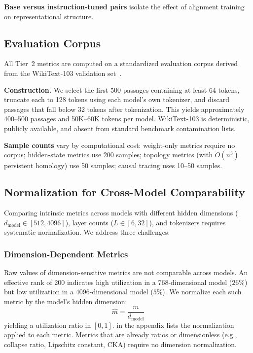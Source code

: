 \documentclass{article}
\begin{document}
\textbf{Base versus instruction-tuned pairs} isolate the effect of alignment training on representational structure.

\subsection{Evaluation Corpus}
\label{sec:corpus}

All Tier~2 metrics are computed on a standardized evaluation corpus derived from the WikiText-103 validation set~\citep{merity2017pointer}.

\textbf{Construction.}
We select the first 500 passages containing at least 64 tokens, truncate each to 128 tokens using each model's own tokenizer, and discard passages that fall below 32 tokens after tokenization.
This yields approximately 400--500 passages and 50K--60K tokens per model.
WikiText-103 is deterministic, publicly available, and absent from standard benchmark contamination lists.

\textbf{Sample counts} vary by computational cost: weight-only metrics require no corpus; hidden-state metrics use 200 samples; topology metrics (with $O(n^3)$ persistent homology) use 50 samples; causal tracing uses 10--50 samples.

\subsection{Normalization for Cross-Model Comparability}
\label{sec:normalization}

Comparing intrinsic metrics across models with different hidden dimensions ($d_{\text{model}} \in [512, 4096]$), layer counts ($L \in [6, 32]$), and tokenizers requires systematic normalization. We address three challenges.

\subsubsection{Dimension-Dependent Metrics}
\label{sec:norm-dim}

Raw values of dimension-sensitive metrics are not comparable across models. An effective rank of 200 indicates high utilization in a 768-dimensional model ($26\%$) but low utilization in a 4096-dimensional model ($5\%$).
We normalize each such metric by the model's hidden dimension:
\begin{equation}
  \hat{m} = \frac{m}{d_{\text{model}}}
  \label{eq:dim-norm}
\end{equation}
yielding a utilization ratio in $[0, 1]$.
 in the appendix lists the normalization applied to each metric.
Metrics that are already ratios or dimensionless (e.g., collapse ratio, Lipschitz constant, CKA) require no dimension normalization.
\end{document}
